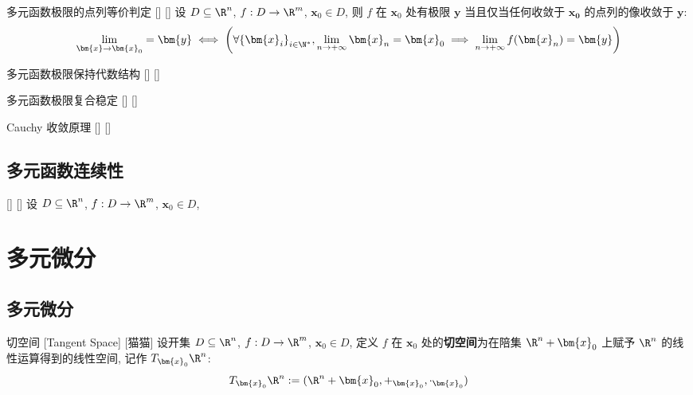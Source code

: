 \documentclass[UTF8]{ctexart}
\begin{document}
			\begin{ppt}
			    []
			    {多元函数极限的点列等价判定}
			    []
			    []
				设 \(D\subseteq\R^n\), \(f:D\to\R^m\), \(\bm{x}_0\in D\), 则 \(f\) 在 \(\bm{x}_0\) 处有极限 \(\bm{y}\) 当且仅当任何收敛于 \(\bm{x_0}\) 的点列的像收敛于 \(\bm{y}\): 
				\[\lim_{\bm{x}\to\bm{x}_0}=\bm{y}
				\iff
				\left(\forall{\{\bm{x}_i\}}_{i\in{\N}^*}, \lim_{n\to+\infty}\bm{x}_n=\bm{x}_0\implies\lim_{n\to+\infty}f(\bm{x}_n)=\bm{y}\right)\]
			\end{ppt}

			\begin{ppt}
			    []
			    {多元函数极限保持代数结构}
			    []
			    []
			\end{ppt}

			\begin{ppt}
			    []
			    {多元函数极限复合稳定}
			    []
			    []
			\end{ppt}

			\begin{thm}
			    []
			    {Cauchy 收敛原理}
			    []
			    []
			\end{thm}
		
		\subsection{多元函数连续性}

			\begin{dfn}
				[]
				{}
				[]
				[]
				设 \(D\subseteq\R^n\), \(f:D\to\R^m\), \(\bm{x}_0\in D\), 
			\end{dfn}
	
	\section{多元微分}

		\subsection{多元微分}

			\begin{dfn}
			    []
			    {切空间}
			    [Tangent Space]
			    [猫猫]
				设开集 \(D\subseteq\R^n\), \(f:D\to\R^m\), \(\bm{x}_0\in D\), 定义 \(f\) 在 \(\bm{x}_0\) 处的\textbf{切空间}为在陪集 \(\R^n+\bm{x}_0\) 上赋予 \(\R^n\) 的线性运算得到的线性空间, 记作 \(T_{\bm{x}_0}\R^n\): 
				\[T_{\bm{x}_0}\R^n:=(\R^n+\bm{x}_0, +_{\bm{x}_0}, \cdot_{\bm{x}_0})\]
			\end{dfn}
			
\end{document}
